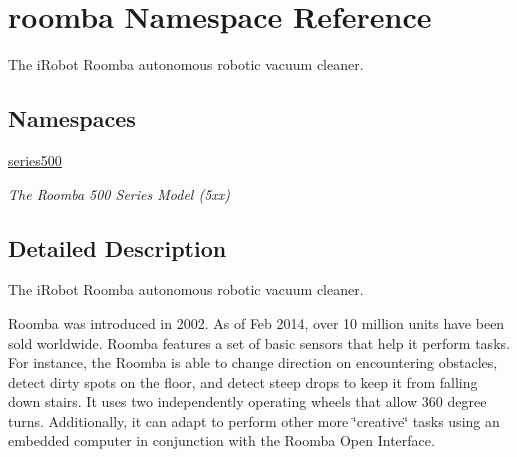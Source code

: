 \hypertarget{namespaceroomba}{\section{roomba Namespace Reference}
\label{namespaceroomba}
}


The i\+Robot Roomba autonomous robotic vacuum cleaner.  


\subsection*{Namespaces}
\begin{DoxyCompactItemize}
\item 
 \hyperlink{namespaceroomba_1_1series500}{series500}
\begin{DoxyCompactList}\small\item\em The Roomba 500 Series Model (5xx) \end{DoxyCompactList}\end{DoxyCompactItemize}


\subsection{Detailed Description}
The i\+Robot Roomba autonomous robotic vacuum cleaner. 

Roomba was introduced in 2002. As of Feb 2014, over 10 million units have been sold worldwide. Roomba features a set of basic sensors that help it perform tasks. For instance, the Roomba is able to change direction on encountering obstacles, detect dirty spots on the floor, and detect steep drops to keep it from falling down stairs. It uses two independently operating wheels that allow 360 degree turns. Additionally, it can adapt to perform other more \char`\"{}creative\char`\"{} tasks using an embedded computer in conjunction with the Roomba Open Interface. 